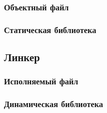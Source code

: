     \subsubsection{Объектный файл}
    \subsubsection{Статическая библиотека}
    \subsection{Линкер}
    \subsubsection{Исполняемый файл}
    \subsubsection{Динамическая библиотека}




